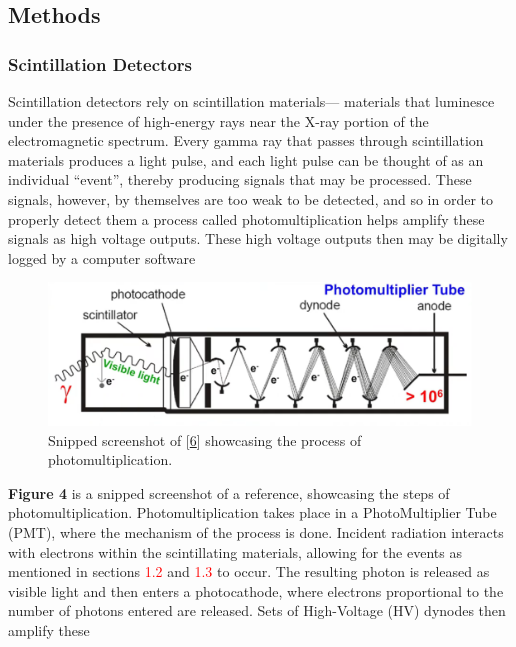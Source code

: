 \documentclass[12pt]{article}
\begin{document}
\begin{multicols}{2}
\subsection{Methods}
\subsubsection{Scintillation Detectors}
Scintillation detectors rely on scintillation materials---
materials that luminesce under the presence of high-energy rays 
near the X-ray portion of the electromagnetic spectrum.
Every gamma ray that passes through scintillation materials produces a light pulse,
and each light pulse can be thought of as an individual ``event'',
thereby producing signals that may be processed.
These signals, however, by themselves are too weak to be detected,
and so in order to properly detect them a process called photomultiplication helps
amplify these signals as high voltage outputs. 
These high voltage outputs then may be digitally logged by a computer software
\begin{figure}[H]
    \centering
    \includegraphics[width=0.98\linewidth]{figs/fig4.png}
    \caption{
        Snipped screenshot of [\hyperref[sec:6]{6}] showcasing the
        process of photomultiplication.
    }
\end{figure}
\noindent
\textbf{Figure 4} is a snipped screenshot of
a reference, showcasing the steps of photomultiplication.
Photomultiplication takes place in a PhotoMultiplier 
Tube (PMT), where the mechanism of the process is 
done. Incident radiation interacts with electrons 
within the scintillating materials, allowing for the 
events as mentioned in sections \textcolor{red}{1.2} and \textcolor{red}{1.3} to occur. 
The resulting photon is released as visible light and 
then enters a photocathode, where electrons 
proportional to the number of photons entered are 
released. Sets of High-Voltage (HV) dynodes then
amplify these
\begin{figure}[H]
    \centering

\end{figure}
\end{multicols}
\end{document}
